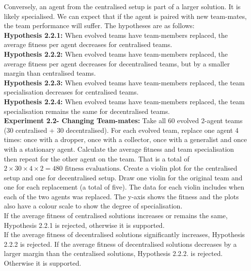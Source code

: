 \documentclass[12pt]{article}
\begin{document}
Conversely, an agent from the centralised setup is part of a larger solution. It is likely specialised. We can expect that if the agent is paired with new team-mates, the team performance will suffer. 
The hypotheses are as follows:\\

\textbf{Hypothesis 2.2.1:} When evolved teams have team-members replaced, the average fitness per agent decreases for centralised teams.\\

\textbf{Hypothesis 2.2.2:} When evolved teams have team-members replaced, the average fitness per agent decreases for decentralised teams, but by a smaller margin than centralised teams.\\

\textbf{Hypothesis 2.2.3:} When evolved teams have team-members replaced, the team specialisation decreases for centralised teams.\\

\textbf{Hypothesis 2.2.4:} When evolved teams have team-members replaced, the team specialisation remains the same for decentralised teams.\\

\textbf{Experiment 2.2- Changing Team-mates:} Take all 60 evolved 2-agent teams (30 centralised + 30 decentralised).
For each evolved team, replace one agent 4 times: once with a dropper, once with a collector, once with a generalist and once with a stationary agent.
Calculate the average fitness and team specialisation then repeat for the other agent on the team.
That is a total of $2 \times 30 \times 4 \times 2= 480 \mbox{ fitness evaluations}$. 
Create a violin plot for the centralised setup and one for decentralised setup.
Draw one violin for the original team and one for each replacement (a total of five).
The data for each violin includes when each of the two agents was replaced.
The y-axis shows the fitness and the plots also have a colour scale to show the degree of specialisation.\\

If the average fitness of centralised solutions increases or remains the same, Hypothesis 2.2.1 is rejected, otherwise it is supported.\\

If the average fitness of decentralised solutions significantly increases, Hypothesis 2.2.2 is rejected.
If the average fitness of decentralised solutions decreases by a larger margin than the centralised solutions, Hypothesis 2.2.2. is rejected.
Otherwise it is supported.\\
\end{document}
